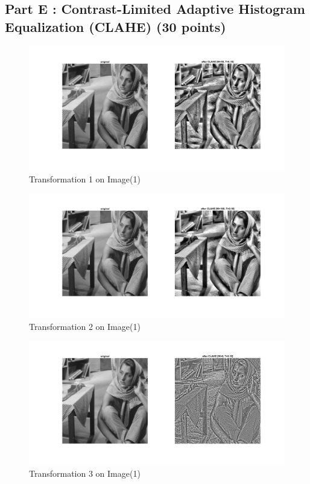 \documentclass[12pt, a4paper]{article}
\begin{document}
\subsection*{Part E :  Contrast-Limited Adaptive Histogram Equalization (CLAHE) 
(30 points)}

\renewcommand{\thefigure}{5.11}
\begin{figure}[H]
    \centering
    \includegraphics[width=\textwidth]{e11.jpg}
    \vspace*{-55pt}
    \caption{Transformation 1 on Image(1)}
    \label{fig:5.11}
\end{figure}
\renewcommand{\thefigure}{5.12}
\begin{figure}[H]
    \centering
    \vspace*{-30pt}
    \includegraphics[width=\textwidth]{e12.jpg}
    \vspace*{-55pt}
    \caption{Transformation 2 on Image(1)}
    \label{fig:5.12}
\end{figure}
\renewcommand{\thefigure}{5.13}
\begin{figure}[H]
    \centering
    \vspace*{-30pt}
    \includegraphics[width=\textwidth]{e13.jpg}
    \vspace*{-55pt}
    \caption{Transformation 3 on Image(1)}
    \label{fig:5.13}
\end{figure}
\end{document}
